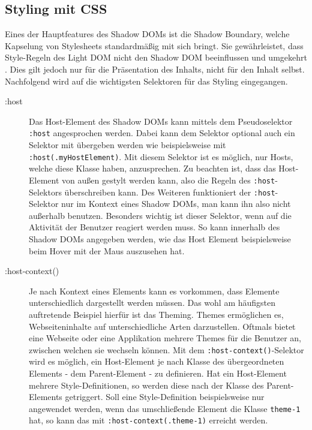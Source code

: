 \subsection{Styling mit CSS}\label{styling-mit-css}

Eines der Hauptfeatures des Shadow \ac{DOM}s ist die Shadow Boundary, welche Kapselung von Stylesheets standardmäßig mit sich bringt. Sie gewährleistet, dass Style-Regeln des Light \ac{DOM} nicht den Shadow \ac{DOM} beeinflussen und umgekehrt \cite{citeulike:13851334}. Dies gilt jedoch nur für die Präsentation des Inhalts, nicht für den Inhalt selbst. Nachfolgend wird auf die wichtigsten Selektoren für das Styling eingegangen.

\begin{description}
  \item[:host] Das Host-Element des Shadow \ac{DOM}s kann mittels dem Pseudoselektor \texttt{:host} angesprochen werden. Dabei kann dem Selektor optional auch ein Selektor mit übergeben werden wie beispielsweise mit \texttt{:host(.myHostElement)}. Mit diesem Selektor ist es möglich, nur Hosts, welche diese Klasse haben, anzusprechen. Zu beachten ist, dass das Host-Element von außen gestylt werden kann, also die Regeln des \texttt{:host}-Selektors überschreiben kann. Des Weiteren funktioniert der \texttt{:host}-Selektor nur im Kontext eines Shadow \ac{DOM}s, man kann ihn also nicht außerhalb benutzen. Besonders wichtig ist dieser Selektor, wenn auf die Aktivität der Benutzer reagiert werden muss. So kann innerhalb des Shadow \ac{DOM}s angegeben werden, wie das Host Element beispielsweise beim Hover mit der Maus auszusehen hat.
  \item[:host-context()] Je nach Kontext eines Elements kann es vorkommen, dass Elemente unterschiedlich dargestellt werden müssen. Das wohl am häufigsten auftretende Beispiel hierfür ist das Theming. Themes ermöglichen es, Webseiteninhalte auf unterschiedliche Arten darzustellen. Oftmals bietet eine Webseite oder eine Applikation mehrere Themes für die Benutzer an, zwischen welchen sie wechseln können. Mit dem \texttt{:host-context()}-Selektor wird es möglich, ein Host-Element je nach Klasse des übergeordneten Elements - dem Parent-Element - zu definieren. Hat ein Host-Element mehrere Style-Definitionen, so werden diese nach der Klasse des Parent-Elements getriggert. Soll eine Style-Definition beispielsweise nur angewendet werden, wenn das umschließende Element die Klasse \texttt{theme-1} hat, so kann das mit \texttt{:host-context(.theme-1)} erreicht werden.
\end{description}


